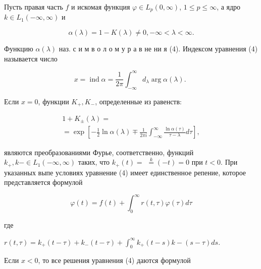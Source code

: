 \documentclass[10pt]{article}
\begin{document}
Пусть правая часть $f$ и искомая функция $\varphi \in L_{p}(0, \infty)$, $1 \leqslant p \leqslant \infty$, а ядро $k \in L_{1}(-\infty, \infty)$ и



\[

\alpha(\lambda)=1-K(\lambda) \neq 0,-\infty<\lambda<\infty .

\]



Функцию $\alpha(\lambda)$ наз. с и м в о л о м у р а в не ни я (4). Индексом уравнения (4) называется число



\[

x=\operatorname{ind} \alpha=\frac{1}{2 \pi} \int_{-\infty}^{\infty} d_{\lambda} \arg \alpha(\lambda) \text {. }

\]



Если $x=0$, функции $K_{+}, K_{-}$, определенные из равенств:



\[

\begin{gathered}

1+K_{ \pm}(\lambda)= \\

=\exp \left[-\frac{1}{2} \ln \alpha(\lambda) \mp \frac{1}{2 \pi i} \int_{-\infty}^{\infty} \frac{\ln \alpha(\tau)}{\tau-\lambda} d \tau\right],

\end{gathered}

\]



являются преобразованиями Фурье, соответственно, функций $k_{+}, k-\in L_{1}(-\infty, \infty)$ таких, что $k_{+}(t)=$ $\stackrel{k}{=}(-t)=0$ при $t<0$. При указанных выпе условиях уравнение (4) имеет единственное репение, которое представляется формулой



\[

\varphi(t)=f(t)+\int_{0}^{\infty} r(t, \tau) \varphi(\tau) d \tau

\]



где



$r(t, \tau)=k_{+}(t-\tau)+k_{-}(t-\tau)+\int_{0}^{\infty} k_{+}(t-s) k-(s-\tau) d s$.



Если $x<0$, то все решения уравнения (4) даются формулой
\end{document}
